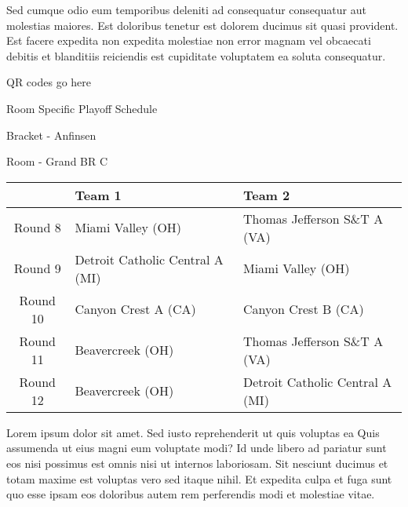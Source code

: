 \documentclass{article}%
\begin{document}
\newline%
Sed cumque odio eum temporibus deleniti ad consequatur consequatur aut molestias maiores. Est doloribus tenetur est dolorem ducimus sit quasi provident. Est facere expedita non expedita molestiae non error magnam vel obcaecati debitis et blanditiis reiciendis est cupiditate voluptatem ea soluta consequatur.%
\vspace*{140pt}%
\begin{center}%
\begin{Huge}%
QR codes go here%
\end{Huge}%
\end{center}%
\newpage%
\begin{center}%
\begin{Huge}%
Room Specific Playoff Schedule%
\end{Huge}%
\vspace*{8pt}%
\linebreak%
\begin{Large}%
Bracket {-} Anfinsen%
\end{Large}%
\vspace*{8pt}%
\linebreak%
\vspace*{8pt}%
\begin{Large}%
Room {-} Grand BR C%
\end{Large}%
\end{center}%
%
\begin{tabularx}{\textwidth}{|c|Y|Y|}%
\hline%
&Team 1&Team 2\\%
\hline%
Round 8&Miami Valley (OH)&Thomas Jefferson S\&T A (VA)\\%
Round 9&Detroit Catholic Central A (MI)&Miami Valley (OH)\\%
Round 10&Canyon Crest A (CA)&Canyon Crest B (CA)\\%
Round 11&Beavercreek (OH)&Thomas Jefferson S\&T A (VA)\\%
Round 12&Beavercreek (OH)&Detroit Catholic Central A (MI)\\%
\hline%
\end{tabularx}%
\vspace*{8pt}%
\newline%
Lorem ipsum dolor sit amet. Sed iusto reprehenderit ut quis voluptas ea Quis assumenda ut eius magni eum voluptate modi? Id unde libero ad pariatur sunt eos nisi possimus est omnis nisi ut internos laboriosam. Sit nesciunt ducimus et totam maxime est voluptas vero sed itaque nihil. Et expedita culpa et fuga sunt quo esse ipsam eos doloribus autem rem perferendis modi et molestiae vitae.\newline%
\end{document}

